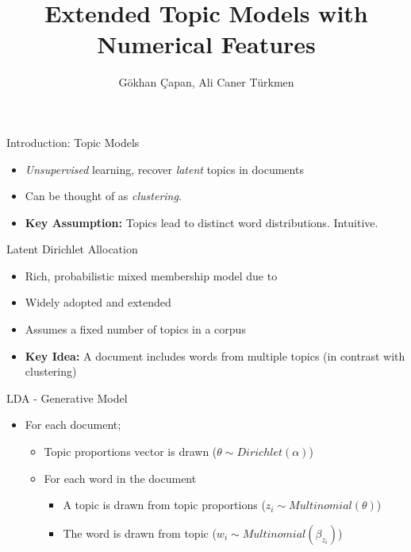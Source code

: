 \documentclass[pdf]{beamer}
\title{Extended Topic Models with Numerical Features}
\author{G\" okhan \c Capan, Ali Caner T\" urkmen}
\begin{document}
	
\begin{frame}
	\titlepage
\end{frame}

\begin{frame}{Introduction: Topic Models}
	
	\begin{itemize}
		\item {\em Unsupervised} learning, recover \emph{latent} topics in documents
		\item Can be thought of as {\em clustering}.
		\item {\bf Key Assumption:} Topics lead to distinct word distributions. Intuitive. 
	\end{itemize}
\end{frame}

\begin{frame}{Latent Dirichlet Allocation}	
	\begin{itemize}
		\item Rich, probabilistic mixed membership model due to \cite{blei_latent_2003}
		\item Widely adopted and extended
		\item Assumes a fixed number of topics in a corpus
		\item {\bf Key Idea: } A document includes words from multiple topics (in contrast with clustering)
	\end{itemize}
\end{frame}

\begin{frame}{LDA - Generative Model}	
	\begin{itemize}
		\item For each document;
		\begin{itemize}
			\item Topic proportions vector is drawn ($\theta \sim Dirichlet(\alpha)$)
			\item For each word in the document
			\begin{itemize}
				\item A topic is drawn from topic proportions ($z_i \sim Multinomial(\theta)$)
				\item The word is drawn from topic ($w_i \sim Multinomial(\beta_{z_i})$)
			\end{itemize}
		\end{itemize}
	\end{itemize}
\end{frame}
\end{document}
